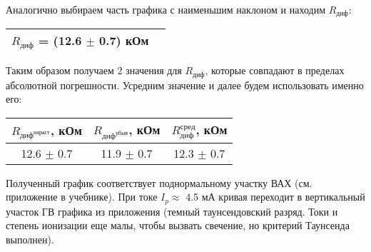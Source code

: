 \documentclass[a4paper,12pt]{article}
\begin{document}

\par Аналогично выбираем часть графика с наименьшим наклоном и находим $R_{\text{диф}}$:

\begin{tabular}{|c|c|}
	\hline
	$R_{\text{диф}}$ = (12.6 $\pm$ 0.7) кОм\\
	\hline
\end{tabular}

\par Таким образом получаем 2 значения для $R_{\text{диф}}$, которые совпадают в пределах абсолютной погрешности. Усредним значение и далее будем использовать именно его: 

\begin{tabular}{|c|c|c|}
	\hline
	$R_{\text{диф}^{\text{нараст}}}$, кОм & $R_{\text{диф}^{\text{убыв}}}$, кОм & $R_{\text{диф}}^{\text{сред}}$, кОм \\
	\hline
	12.6 $\pm$ 0.7 & 11.9 $\pm$ 0.7 & 12.3 $\pm$ 0.7 \\
	\hline
\end{tabular}

\par Полученный график соответствует поднормальному участку ВАХ (см. приложение в учебнике). При токе $I_p \approx$ 4.5 мА кривая переходит в вертикальный участок ГВ графика из приложения (темный таунсендовский разряд. Токи и степень ионизации еще малы, чтобы вызвать свечение, но критерий Таунсенда выполнен). 
\end{document}
